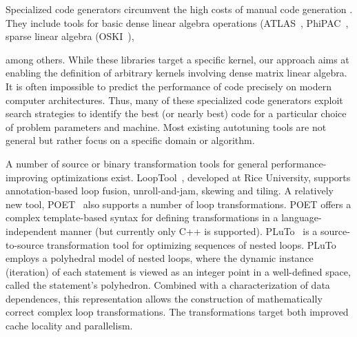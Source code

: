 \documentclass[runningheads]{llncs}
\begin{document}
Specialized code generators circumvent the high costs of manual code
generation . They include tools for basic dense linear algebra operations
(ATLAS~\cite{WN147}, PhiPAC~\cite{bilmes97optimizing},
sparse linear algebra (OSKI~\cite{vuduc05}), 

among others.  While these libraries target a specific kernel, our approach aims 
at enabling the definition of arbitrary kernels involving dense matrix linear algebra.
It is often impossible to predict the performance of code precisely
on modern computer architectures. Thus, many of these specialized code
generators exploit search strategies to identify the best (or nearly best)
code for a particular choice of problem parameters and machine. Most existing
autotuning tools are not general but rather focus on a specific domain or algorithm.


A number of source or binary transformation tools for general
performance-improving optimizations exist. LoopTool~\cite{LoopTool},
developed at Rice University, supports annotation-based loop fusion,
unroll-and-jam, skewing and tiling.  A relatively new tool, POET~\cite{POET}
also supports a number of loop transformations. POET offers a complex
template-based syntax for defining transformations in a language-independent
manner (but currently only C++ is supported). 
PLuTo~\cite{Pluto}
is a source-to-source transformation tool for
optimizing sequences of nested loops. PLuTo employs a polyhedral model of
nested loops, where the dynamic instance (iteration) of each statement is
viewed as an integer point in a well-defined space, called the statement's
polyhedron. Combined with a characterization of data dependences, this
representation allows the construction of mathematically correct complex loop
transformations. The transformations target both improved cache locality and
parallelism.
\end{document}
